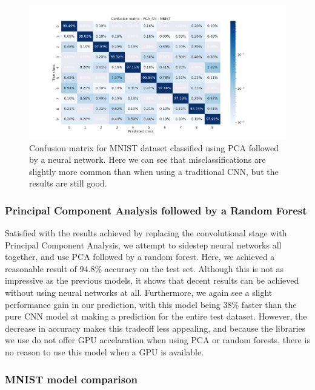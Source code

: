 \documentclass[onecolumn,10pt,cleanfoot]{asme2ej}
\begin{document}
\begin{figure}[H]
\centerline{\includegraphics[width=8in]{figure/conf_pca_nn_MNIST.png}}
\caption{Confusion matrix for MNIST dataset classified using PCA followed by a neural network. Here we can see that misclassifications are slightly more common than when using a traditional CNN, but the results are still good.}
\label{mnistheatmap_pcann}
\end{figure}


\subsubsection{Principal Component Analysis followed by a Random Forest}

Satisfied with the results achieved by replacing the convolutional stage with Principal Component Analysis, we attempt to sidestep neural networks all together, and use PCA followed by a random forest. Here, we achieved a reasonable result of $94.8\%$ accuracy on the test set. Although this is not as impressive as the previous models, it shows that decent results can be achieved without using neural networks at all. Furthermore, we again see a slight performance gain in our prediction, with this model being $38\%$ faster than the pure CNN model at making a prediction for the entire test dataset. However, the decrease in accuracy makes this tradeoff less appealing, and because the libraries we use do not offer GPU accelaration when using PCA or random forests, there is no reason to use this model when a GPU is available.

\subsubsection{MNIST model comparison}
\end{document}
